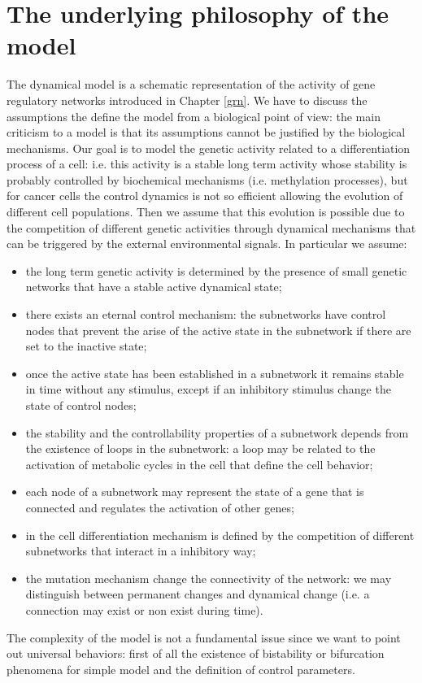 \section{The underlying philosophy of the model}
The dynamical model is a schematic representation of the activity of gene regulatory networks introduced in Chapter \ref{grn}. We have to discuss the assumptions the define the model from a biological 
point of view: the main criticism to a model is that its assumptions cannot be justified by the biological mechanisms. 
Our goal is to model the genetic activity related to a differentiation process of a cell: i.e. this activity is a stable long term activity whose stability
is probably controlled by biochemical mechanisms (i.e. methylation processes), but for cancer cells the control dynamics is not so efficient allowing
the evolution of different cell populations. Then we assume that this evolution is possible due to the competition of different genetic activities through
dynamical mechanisms that can be triggered by the external environmental signals.
In particular we assume:
\begin{itemize}
\item the long term genetic activity is determined by the presence of small genetic networks that have a stable active dynamical state;
\item there exists an eternal control mechanism: the subnetworks have control nodes that prevent the arise of the active state in the subnetwork if there
are set to the inactive state;
\item once the active state has been established in a subnetwork it remains stable in time without any stimulus, except if an inhibitory stimulus 
change the state of control nodes;
\item the stability and the controllability properties of a subnetwork depends from the existence of loops in the subnetwork: a loop may be related to the activation
of metabolic cycles in the cell that define the cell behavior;
\item each node of a subnetwork may represent the state of a gene that is connected and regulates the activation of other genes;
\item in the cell differentiation mechanism is defined by the competition of different subnetworks that interact in a inhibitory way;
\item the mutation mechanism change the connectivity of the network: we may distinguish between permanent changes and dynamical change (i.e. a connection
may exist or non exist during time).
\end{itemize}
The complexity of the model is not a fundamental issue since we want to point out universal behaviors:  first of all the existence of bistability or bifurcation 
phenomena for simple model and the definition of control parameters.
%
